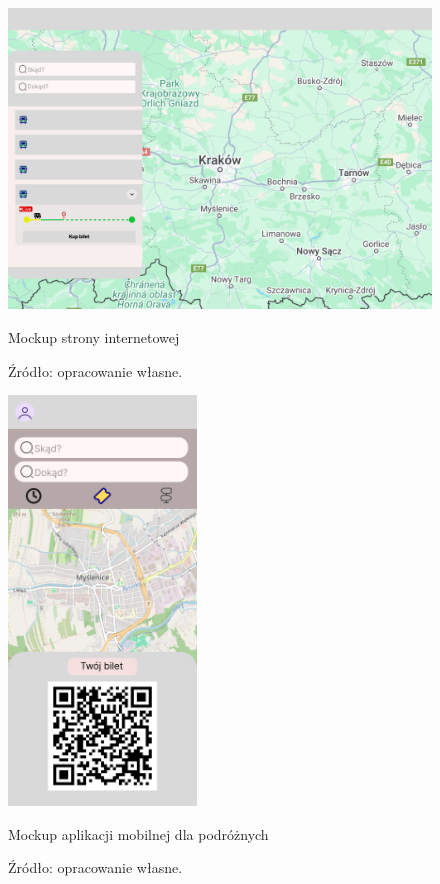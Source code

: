 \newpage

\begin{figure}
	\centering
	\includegraphics[width=150mm]{images/website.jpg}
	\caption{Mockup strony internetowej}
	\caption*{Źródło: opracowanie własne.}
    \label{fig:website}
\end{figure}
\begin{figure}
	\centering
	\includegraphics[width=50mm]{images/phone.jpg}
	\caption{Mockup aplikacji mobilnej dla podróżnych}
	\caption*{Źródło: opracowanie własne.}
    \label{fig:phone}
\end{figure}
